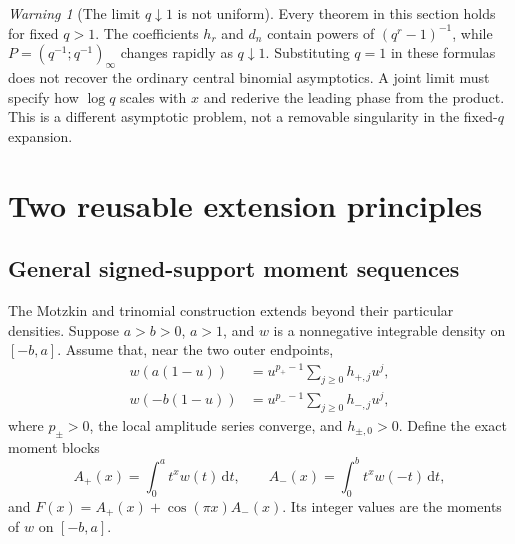 \documentclass[11pt,a4paper]{article}
\theoremstyle{definition}
\theoremstyle{remark}
\newtheorem{warning}[theorem]{Warning}
\newcommand{\dd}{\mathrm d}
\numberwithin{equation}{section}
\begin{document}
\begin{warning}[The limit $q\downarrow1$ is not uniform]
Every theorem in this section holds for fixed $q>1$. The coefficients $h_r$ and $d_n$ contain powers of $(q^r-1)^{-1}$, while $P=(q^{-1};q^{-1})_\infty$ changes rapidly as $q\downarrow1$. Substituting $q=1$ in these formulas does not recover the ordinary central binomial asymptotics. A joint limit must specify how $\log q$ scales with $x$ and rederive the leading phase from the product. This is a different asymptotic problem, not a removable singularity in the fixed-$q$ expansion.
\end{warning}

\section{Two reusable extension principles}
\label{sec:principles}

\subsection{General signed-support moment sequences}
The Motzkin and trinomial construction extends beyond their particular densities. Suppose $a>b>0$, $a>1$, and $w$ is a nonnegative integrable density on $[-b,a]$. Assume that, near the two outer endpoints,
\begin{align}
 w(a(1-u))&=u^{p_+-1}\sum_{j\ge0}h_{+,j}u^j,\nonumber\\
 w(-b(1-u))&=u^{p_--1}\sum_{j\ge0}h_{-,j}u^j,
 \label{eq:generalendpoints}
\end{align}
where $p_\pm>0$, the local amplitude series converge, and $h_{\pm,0}>0$. Define the exact moment blocks
\[
 A_+(x)=\int_0^a t^xw(t)\,\dd t,\qquad
 A_-(x)=\int_0^b t^xw(-t)\,\dd t,
\]
and $F(x)=A_+(x)+\cos(\pi x)A_-(x)$. Its integer values are the moments of $w$ on $[-b,a]$.
\end{document}

